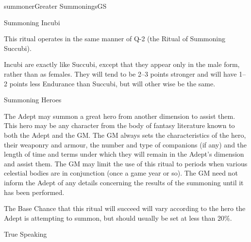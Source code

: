 \begin{college}[1.0]{summoner}{Greater Summonings}{GS}
\begin{ritual}[Q-3]{Summoning Incubi}

\begin{effects}
This ritual operates in the same manner of Q-2 (the Ritual of
Summoning Succubi).

Incubi are exactly like Succubi, except that they appear only in the
male form, rather than as females.  They will tend to be 2--3 points
stronger and will have 1--2 points less Endurance than Succubi, but
will other wise be the same.
\end{effects}
\end{ritual}

\begin{ritual}[Q-4]{Summoning Heroes}

\begin{effects}
The Adept may summon a great hero from another dimension to assist
them.  This hero may be any character from the body of fantasy
literature known to both the Adept and the GM.  The GM always sets the
characteristics of the hero, their weaponry and armour, the number and
type of companions (if any) and the length of time and terms under
which they will remain in the Adept's dimension and assist them.  The
GM may limit the use of this ritual to periods when various celestial
bodies are in conjunction (once a game year or so).  The GM need not
inform the Adept of any details concerning the results of the
summoning until it has been performed.

The Base Chance that this ritual will succeed will vary according to
the hero the Adept is attempting to summon, but should usually be set
at less than 20\%.
\end{effects}
\end{ritual}

\begin{ritual}[Q-5]{True Speaking}


\end{ritual}
\end{college}
